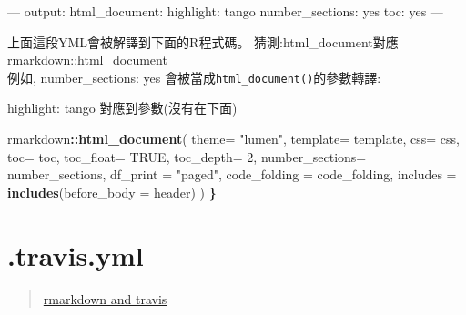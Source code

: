 \documentclass[]{book}
\newenvironment{Shaded}{\begin{snugshade}}{\end{snugshade}}
\newcommand{\AttributeTok}[1]{\textcolor[rgb]{0.77,0.63,0.00}{#1}}
\newcommand{\DataTypeTok}[1]{\textcolor[rgb]{0.13,0.29,0.53}{#1}}
\newcommand{\DecValTok}[1]{\textcolor[rgb]{0.00,0.00,0.81}{#1}}
\newcommand{\ErrorTok}[1]{\textcolor[rgb]{0.64,0.00,0.00}{\textbf{#1}}}
\newcommand{\FunctionTok}[1]{\textcolor[rgb]{0.00,0.00,0.00}{#1}}
\newcommand{\KeywordTok}[1]{\textcolor[rgb]{0.13,0.29,0.53}{\textbf{#1}}}
\newcommand{\NormalTok}[1]{#1}
\newcommand{\OperatorTok}[1]{\textcolor[rgb]{0.81,0.36,0.00}{\textbf{#1}}}
\newcommand{\OtherTok}[1]{\textcolor[rgb]{0.56,0.35,0.01}{#1}}
\newcommand{\StringTok}[1]{\textcolor[rgb]{0.31,0.60,0.02}{#1}}
\theoremstyle{definition}
\theoremstyle{definition}
\theoremstyle{definition}
\theoremstyle{remark}
\begin{document}
\begin{Shaded}
\begin{Highlighting}[]
\OtherTok{---}
\FunctionTok{output:}\AttributeTok{ }
  \FunctionTok{html_document:}\AttributeTok{ }
    \FunctionTok{highlight:}\AttributeTok{ tango}
    \FunctionTok{number_sections:}\AttributeTok{ yes}
    \FunctionTok{toc:}\AttributeTok{ yes}
\OtherTok{---}
\end{Highlighting}
\end{Shaded}

上面這段YML會被解譯到下面的R程式碼。
猜測:html\_document對應rmarkdown::html\_document\\
例如, number\_sections: yes 會被當成\texttt{html\_document()}的參數轉譯:

highlight: tango 對應到參數(沒有在下面)

\begin{Shaded}
\begin{Highlighting}[]
\NormalTok{rmarkdown}\OperatorTok{::}\KeywordTok{html_document}\NormalTok{( }\DataTypeTok{theme=} \StringTok{"lumen"}\NormalTok{,}
                               \DataTypeTok{template=}\NormalTok{ template,}
                               \DataTypeTok{css=}\NormalTok{ css,}
                               \DataTypeTok{toc=}\NormalTok{ toc,}
                               \DataTypeTok{toc_float=} \OtherTok{TRUE}\NormalTok{,}
                               \DataTypeTok{toc_depth=} \DecValTok{2}\NormalTok{,}
                               \DataTypeTok{number_sections=}\NormalTok{ number_sections,}
                               \DataTypeTok{df_print =} \StringTok{"paged"}\NormalTok{,}
                               \DataTypeTok{code_folding =}\NormalTok{ code_folding,}
                               \DataTypeTok{includes =} \KeywordTok{includes}\NormalTok{(}\DataTypeTok{before_body =}\NormalTok{ header)}
\NormalTok{                            )}
\ErrorTok{\}}
\end{Highlighting}
\end{Shaded}

\hypertarget{travis.yml}{%
\section{.travis.yml}\label{travis.yml}}

\begin{quote}
\href{http://www.goring.org/resources/Adding_CI_To_RMarkdown.html}{rmarkdown
and travis}
\end{quote}
\end{document}
